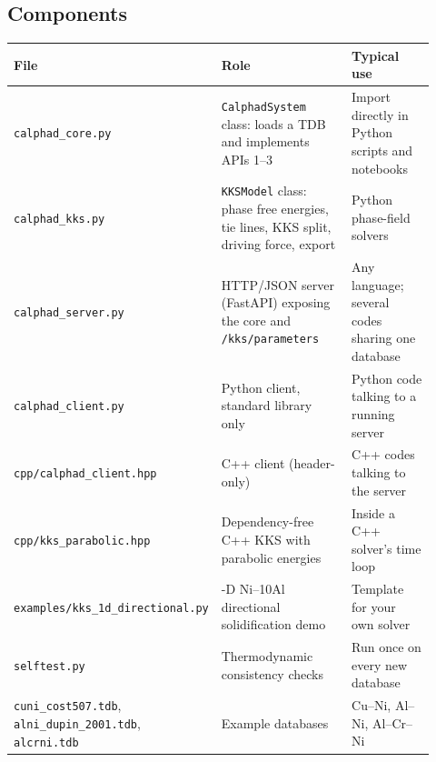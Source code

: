 \documentclass[12pt,a4paper]{article}
\begin{document}
\subsection*{Components}
\begingroup\small
\begin{longtable}{>{\raggedright\arraybackslash}p{0.234\linewidth}>{\raggedright\arraybackslash}p{0.412\linewidth}>{\raggedright\arraybackslash}p{0.275\linewidth}}
\toprule
\textbf{File} & \textbf{Role} & \textbf{Typical use} \\
\midrule
\endhead
\texttt{calphad\_\allowbreak{}core.\allowbreak{}py} & \texttt{CalphadSystem} class: loads a TDB and implements APIs 1--3 & Import directly in Python scripts and notebooks \\
\texttt{calphad\_\allowbreak{}kks.\allowbreak{}py} & \texttt{KKSModel} class: phase free energies, tie lines, KKS split, driving force, export & Python phase-field solvers \\
\texttt{calphad\_\allowbreak{}server.\allowbreak{}py} & HTTP/JSON server (FastAPI) exposing the core and \texttt{/\allowbreak{}kks/\allowbreak{}parameters} & Any language; several codes sharing one database \\
\texttt{calphad\_\allowbreak{}client.\allowbreak{}py} & Python client, standard library only & Python code talking to a running server \\
\texttt{cpp/\allowbreak{}calphad\_\allowbreak{}client.\allowbreak{}hpp} & C++ client (header-only) & C++ codes talking to the server \\
\texttt{cpp/\allowbreak{}kks\_\allowbreak{}parabolic.\allowbreak{}hpp} & Dependency-free C++ KKS with parabolic energies & Inside a C++ solver's time loop \\
\texttt{examples/\allowbreak{}kks\_\allowbreak{}1d\_\allowbreak{}directional.\allowbreak{}py} & 1-D Ni--10Al directional solidification demo & Template for your own solver \\
\texttt{selftest.\allowbreak{}py} & Thermodynamic consistency checks & Run once on every new database \\
\texttt{cuni\_\allowbreak{}cost507.\allowbreak{}tdb}, \texttt{alni\_\allowbreak{}dupin\_\allowbreak{}2001.\allowbreak{}tdb}, \texttt{alcrni.\allowbreak{}tdb} & Example databases & Cu--Ni, Al--Ni, Al--Cr--Ni \\
\bottomrule
\end{longtable}
\endgroup

\end{document}
